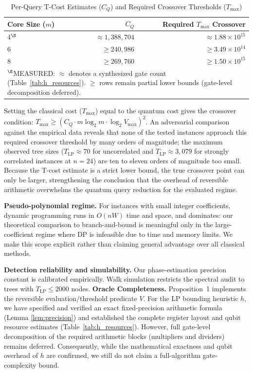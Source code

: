 \documentclass[conference]{IEEEtran} \IEEEoverridecommandlockouts
\begin{document}
\begin{table}[htbp]
\caption{Per-Query T-Cost Estimates ($C_Q$) and Required Crossover Thresholds ($T_{\max}$)}
\label{tab:crossover}
\begin{center}
\begin{tabular}{lrr}
\toprule
\textbf{Core Size ($m$)} & \textbf{$C_Q$} & \textbf{Required $T_{\max}$ Crossover} \\
\midrule
4$^\S$ & $\approx 1{,}388{,}704$ & $\approx 1.88 \times 10^{15}$ \\
6 & $\ge 240{,}986$ & $\ge 3.49 \times 10^{14}$ \\
8 & $\ge 269{,}760$ & $\ge 1.50 \times 10^{15}$ \\
\bottomrule
\multicolumn{3}{l}{\footnotesize $^\S$MEASURED: $\approx$ denotes a synthesized gate count (Table~\ref{tab:h_resources}). $\ge$ rows remain partial lower bounds (gate-level decomposition deferred).}
\end{tabular}
\end{center}
\end{table}

Setting the classical cost ($T_{\max}$) equal to the quantum cost gives the crossover condition: $T_{\max} \ge (C_Q \cdot m \log_2 m \cdot \log_2 V_{\max})^2$. An adversarial comparison against the empirical data reveals that none of the tested instances approach this required crossover threshold by many orders of magnitude; the maximum observed tree sizes ($T_{\text{LP}} \approx 70$ for uncorrelated and $T_{\text{LP}} \approx 3{,}079$ for strongly correlated instances at $n=24$) are ten to eleven orders of magnitude too small. Because the T-cost estimate is a strict lower bound, the true crossover point can only be larger, strengthening the conclusion that the overhead of reversible arithmetic overwhelms the quantum query reduction for the evaluated regime.

\textbf{Pseudo-polynomial regime.} For instances with small integer coefficients, dynamic programming runs in $O(nW)$ time and space, and dominates: our theoretical comparison to branch-and-bound is meaningful only in the large-coefficient regime where DP is infeasible due to time and memory limits. We make this scope explicit rather than claiming general advantage over all classical methods.

\textbf{Detection reliability and simulability.} Our phase-estimation precision constant is calibrated empirically. Walk simulation restricts the spectral audit to trees with $T_{\text{LP}} \le 2000$ nodes. \textbf{Oracle Completeness.} Proposition~1 implements the reversible evaluation/threshold predicate $V$. For the LP bounding heuristic $h$, we have specified and verified an exact fixed-precision arithmetic formula (Lemma \ref{lem:precision}) and established the complete register layout and qubit resource estimates (Table~\ref{tab:h_resources}). However, full gate-level decomposition of the required arithmetic blocks (multipliers and dividers) remains deferred. Consequently, while the mathematical exactness and qubit overhead of $h$ are confirmed, we still do not claim a full-algorithm gate-complexity bound.
\end{document}
